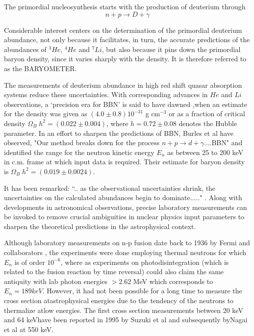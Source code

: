 The primordial nucleosynthesis starts with the production of deuterium through
$$
n+p \to D+ \gamma
$$

Considerable interest centers on the determination of the primordial deuterium abundance, not only because it facilitates, in turn, the accurate predictions of the abundances of $^3He$, $^4He$ and $^7Li$, but also because it pins down the primordial baryon density, since it varies sharply with  the density. It is therefore referred to as the BARYOMETER.

The measurements of deuterium abundance in high red shift quasar absorption systems \cite{chap34-key15} reduce these uncertainties. With corresponding advances in $He$ and $Li$ observations, a `precision era for BBN' is said to have dawned \cite{chap34-key16},when an estimate for the density was given as $(4.0 \pm 0.8) 10^{-31}$ g cm$^{-3}$ or as a fraction of critical density $\Omega_B \;h^{2} = (0.022\pm 0.004)$, where $h=0.72\pm 0.08$ denotes the Hubble parameter.   In an effort to sharpen the predictions of BBN, Burles et al \cite{chap34-key17} have observed, "Our method breaks down for the process $n + p \to d+\gamma$....BBN" and identified the range for the neutron kinetic energy $E_n$ as between 25 to 200 keV in c.m. frame at which input data is required. Their estimate for baryon density  is $\Omega_B \;h^{2} = (0.019\pm 0.0024)$. 

It has been remarked: ``.. as the observational uncertainties shrink, the uncertainties on the  calculated abundances begin to dominate....." \cite {chap34-key18}. Along with  developments in astronomical observations, precise laboratory measurements can be invoked to remove crucial ambiguities in nuclear  physics input parameters to sharpen the theoretical predictions in the astrophysical context. 

Although laboratory  measurements on n-p fusion date back to 1936 by Fermi and collaborators \cite{chap34-key19}, the experiments were done employing thermal neutrons for which $E_n$ is of order $10^{-6}$, where as experiments on  photodisintegration (which is related to the fusion reaction by time reversal) could also claim the same antiquity with lab photon energies $> 2.62$ MeV which corresponds to $E_n = 189 keV$. However, it had not been possible  for a long time to measure the cross section atastrophysical energies due to the tendency of the neutrons to thermalize atlow energies. The first cross section measurements between 20 keV and 64 keVhave been reported in 1995 by Suzuki et al \cite{chap34-key20} and subsequently byNagai et al \cite{chap34-key21} at 550 keV. 

